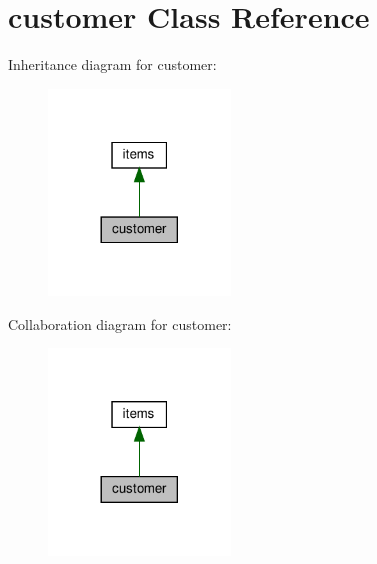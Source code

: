 \hypertarget{classcustomer}{}\section{customer Class Reference}
\label{classcustomer}


Inheritance diagram for customer\+:
\nopagebreak
\begin{figure}[H]
\begin{center}
\leavevmode
\includegraphics[width=137pt]{classcustomer__inherit__graph}
\end{center}
\end{figure}


Collaboration diagram for customer\+:
\nopagebreak
\begin{figure}[H]
\begin{center}
\leavevmode
\includegraphics[width=137pt]{classcustomer__coll__graph}
\end{center}
\end{figure}
